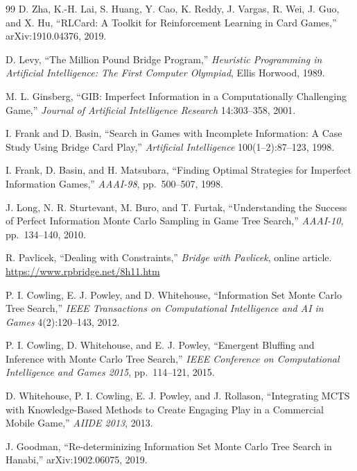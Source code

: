 \documentclass[11pt]{article}
\theoremstyle{definition}
\begin{document}
\begin{thebibliography}{99}
D. Zha, K.-H. Lai, S. Huang, Y. Cao, K. Reddy, J. Vargas, R. Wei, J. Guo, and
X. Hu, ``RLCard: A Toolkit for Reinforcement Learning in Card Games,''
arXiv:1910.04376, 2019.


D. Levy, ``The Million Pound Bridge Program,'' \emph{Heuristic Programming in
Artificial Intelligence: The First Computer Olympiad}, Ellis Horwood, 1989.

M. L. Ginsberg, ``GIB: Imperfect Information in a Computationally Challenging
Game,'' \emph{Journal of Artificial Intelligence Research} 14:303--358, 2001.

I. Frank and D. Basin, ``Search in Games with Incomplete Information: A Case
Study Using Bridge Card Play,'' \emph{Artificial Intelligence}
100(1--2):87--123, 1998.

I. Frank, D. Basin, and H. Matsubara, ``Finding Optimal Strategies for Imperfect
Information Games,'' \emph{AAAI-98}, pp.~500--507, 1998.

J. Long, N. R. Sturtevant, M. Buro, and T. Furtak, ``Understanding the Success
of Perfect Information Monte Carlo Sampling in Game Tree Search,''
\emph{AAAI-10}, pp.~134--140, 2010.

R. Pavlicek, ``Dealing with Constraints,'' \emph{Bridge with Pavlicek}, online
article.\\
\url{https://www.rpbridge.net/8h11.htm}

P. I. Cowling, E. J. Powley, and D. Whitehouse, ``Information Set Monte Carlo
Tree Search,'' \emph{IEEE Transactions on Computational Intelligence and AI in
Games} 4(2):120--143, 2012.

P. I. Cowling, D. Whitehouse, and E. J. Powley, ``Emergent Bluffing and
Inference with Monte Carlo Tree Search,'' \emph{IEEE Conference on Computational
Intelligence and Games 2015}, pp.~114--121, 2015.

D. Whitehouse, P. I. Cowling, E. J. Powley, and J. Rollason, ``Integrating MCTS
with Knowledge-Based Methods to Create Engaging Play in a Commercial Mobile
Game,'' \emph{AIIDE 2013}, 2013.

J. Goodman, ``Re-determinizing Information Set Monte Carlo Tree Search in
Hanabi,'' arXiv:1902.06075, 2019.


\end{thebibliography}
\end{document}
